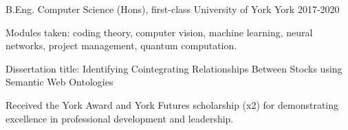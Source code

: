 
\begin{cventries}
  \cventry
    {B.Eng. Computer Science (Hons), first-class} %
    {University of York} %
    {York} %
    {2017-2020} %
    {
      \begin{cvitems} %
         \item {Modules taken: coding theory, computer vision, machine learning, neural networks, project management, quantum computation.}
         \vspace{0.5mm}
         \item {Dissertation title: Identifying Cointegrating Relationships Between Stocks using Semantic Web Ontologies}
         \vspace{0.5mm}
         \item{Received the York Award and York Futures scholarship (x2) for demonstrating excellence in professional development and leadership.}
      \end{cvitems}
    }
\end{cventries}